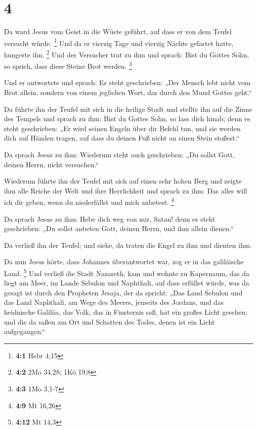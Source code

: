 \hypertarget{section-2}{%
\section{4}\label{section-2}}

 Da ward Jesus vom Geist in die Wüste geführt, auf dass er
von dem Teufel versucht würde. \footnote{\textbf{4:1} Hebr 4,15}
 Und da er vierzig Tage und vierzig Nächte gefastet hatte,
hungerte ihn. \footnote{\textbf{4:2} 2Mo 34,28; 1Kö 19,8} 
Und der Versucher trat zu ihm und sprach: Bist du Gottes Sohn, so
sprich, dass diese Steine Brot werden. \footnote{\textbf{4:3} 1Mo 3,1-7}

 Und er antwortete und sprach: Es steht geschrieben: „Der
Mensch lebt nicht vom Brot allein, sondern von einem jeglichen Wort, das
durch den Mund Gottes geht.``

 Da führte ihn der Teufel mit sich in die heilige Stadt
und stellte ihn auf die Zinne des Tempels  und sprach zu
ihm: Bist du Gottes Sohn, so lass dich hinab; denn es steht geschrieben:
„Er wird seinen Engeln über dir Befehl tun, und sie werden dich auf
Händen tragen, auf dass du deinen Fuß nicht an einen Stein stoßest.``

 Da sprach Jesus zu ihm: Wiederum steht auch geschrieben:
„Du sollst Gott, deinen Herrn, nicht versuchen.``

 Wiederum führte ihn der Teufel mit sich auf einen sehr
hohen Berg und zeigte ihm alle Reiche der Welt und ihre Herrlichkeit
 und sprach zu ihm: Das alles will ich dir geben, wenn du
niederfällst und mich anbetest. \footnote{\textbf{4:9} Mt 16,26}

 Da sprach Jesus zu ihm: Hebe dich weg von mir, Satan!
denn es steht geschrieben: „Du sollst anbeten Gott, deinen Herrn, und
ihm allein dienen.``

 Da verließ ihn der Teufel; und siehe, da traten die
Engel zu ihm und dienten ihm.

 Da nun Jesus hörte, dass Johannes überantwortet war, zog
er in das galiläische Land. \footnote{\textbf{4:12} Mt 14,3}
 Und verließ die Stadt Nazareth, kam und wohnte zu
Kapernaum, das da liegt am Meer, im Lande Sebulon und Naphthali,
 auf dass erfüllet würde, was da gesagt ist durch den
Propheten Jesaja, der da spricht:  „Das Land Sebulon und
das Land Naphthali, am Wege des Meeres, jenseits des Jordans, und das
heidnische Galiläa,  das Volk, das in Finsternis saß, hat
ein großes Licht gesehen; und die da saßen am Ort und Schatten des
Todes, denen ist ein Licht aufgegangen.``

